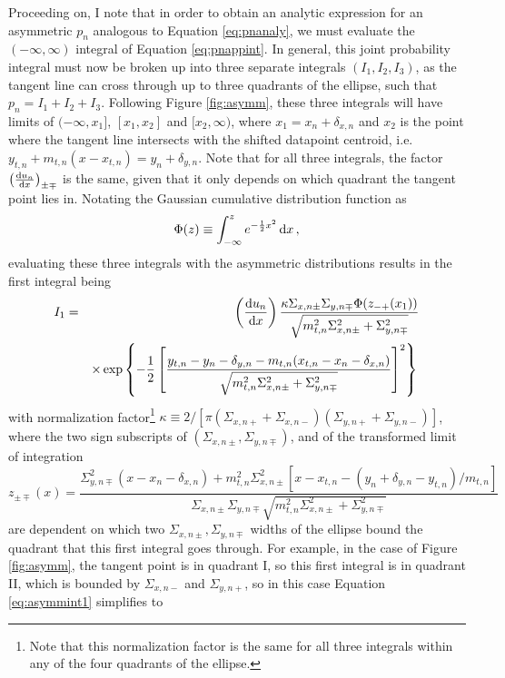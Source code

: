 Proceeding on, I note that in order to obtain an analytic expression for an asymmetric $p_n$ analogous to Equation \eqref{eq:pnanaly}, we must evaluate the $(-\infty,\infty)$ integral of Equation \eqref{eq:pnappint}. In general, this joint probability integral must now be broken up into three separate integrals $(I_1,I_2,I_3)$, as the tangent line can cross through up to three quadrants of the ellipse, such that $p_n=I_1+I_2+I_3$. Following Figure \ref{fig:asymm}, these three integrals will have limits of $(-\infty, x_1]$, $[x_1,x_2]$ and $[x_2,\infty)$, where $x_1=x_n+\delta_{x,n}$ and $x_2$ is the point where the tangent line intersects with the shifted datapoint centroid, i.e. $y_{t,n}+m_{t,n}(x-x_{t,n})=y_n+\delta_{y,n}$. Note that for all three integrals, the factor $\left(\dv{u_n}{x}\right)_{\pm\mp}$ is the same, given that it only depends on which quadrant the tangent point lies in. Notating the Gaussian cumulative distribution function as
\begin{equation}
\Phi(z)\equiv\int_{-\infty}^z{e^{-\frac{1}{2}x^2}\mathop{}\!\mathrm{d} x} \, ,
\end{equation}
evaluating these three integrals with the asymmetric distributions results in the first integral being
\begin{eqnarray}\label{eq:asymmint1}
I_1& = & \left(\dv{u_n}{x}\right)\frac{\kappa\Sigma_{x,n\pm}\Sigma_{y,n\mp}\Phi(z_{-+}(x_1))}{\sqrt{m_{t,n}^2\Sigma_{x,n\pm}^2+\Sigma_{y,n\mp}^2}} \nonumber \\
& &\times \exp\left\{-\frac{1}{2}\left[\frac{y_{t,n}-y_n-\delta_{y,n}-m_{t,n}(x_{t,n}-x_n-\delta_{x,n})}{\sqrt{m_{t,n}^2\Sigma_{x,n\pm}^2+\Sigma_{y,n\mp}^2}}\right]^2\right\} \, 
\end{eqnarray}
with normalization factor\footnote{Note that this normalization factor is the same for all three integrals within any of the four quadrants of the ellipse.} $\kappa\equiv 2/[\pi(\Sigma_{x,n+}+\Sigma_{x,n-})(\Sigma_{y,n+}+\Sigma_{y,n-})]$, where the two sign subscripts of $(\Sigma_{x,n\pm}, \Sigma_{y,n\mp})$, and of the transformed limit of integration
\begin{equation}\label{eq:asymmzlim}
z_{\pm\mp}(x) = \frac{\Sigma_{y,n\mp}^2(x-x_n-\delta_{x,n})+m_{t,n}^2\Sigma_{x,n\pm}^2\left[x-x_{t,n}-(y_n+\delta_{y,n}-y_{t,n})/m_{t,n}\right]}{\Sigma_{x,n\pm}\Sigma_{y,n\mp}\sqrt{m_{t,n}^2\Sigma_{x,n\pm}^2+\Sigma_{y,n\mp}^2}} \,
\end{equation}
are dependent on which two $\Sigma_{x,n\pm}, \Sigma_{y,n\mp}$ widths of the ellipse bound the quadrant that this first integral goes through. For example, in the case of Figure \ref{fig:asymm}, the tangent point is in quadrant I, so this first integral is in quadrant II, which is bounded by $\Sigma_{x,n-}$ and $\Sigma_{y,n+}$, so in this case Equation \eqref{eq:asymmint1} simplifies to
